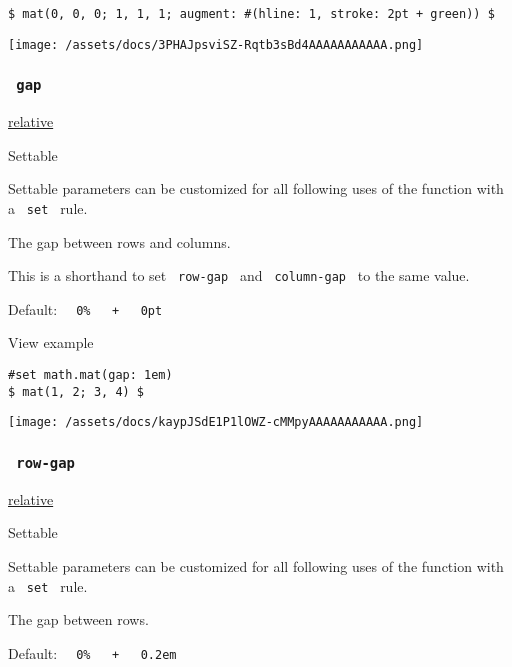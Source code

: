 \begin{verbatim}
$ mat(0, 0, 0; 1, 1, 1; augment: #(hline: 1, stroke: 2pt + green)) $
\end{verbatim}

\texttt{[image: /assets/docs/3PHAJpsviSZ-Rqtb3sBd4AAAAAAAAAAA.png]}

\subsubsection{\texorpdfstring{\texttt{\ gap\ }}{ gap }}\label{parameters-gap}

\href{/docs/reference/layout/relative/}{relative}

{{ Settable }}

\label{parameters-gap-settable-tooltip}
Settable parameters can be customized for all following uses of the
function with a \texttt{\ set\ } rule.

The gap between rows and columns.

This is a shorthand to set \texttt{\ row-gap\ } and
\texttt{\ column-gap\ } to the same value.

Default:
\texttt{\ }{\texttt{\ 0\%\ }}\texttt{\ }{\texttt{\ +\ }}\texttt{\ }{\texttt{\ 0pt\ }}\texttt{\ }


View example

\begin{verbatim}
#set math.mat(gap: 1em)
$ mat(1, 2; 3, 4) $
\end{verbatim}

\texttt{[image: /assets/docs/kaypJSdE1P1lOWZ-cMMpyAAAAAAAAAAA.png]}

\subsubsection{\texorpdfstring{\texttt{\ row-gap\ }}{ row-gap }}\label{parameters-row-gap}

\href{/docs/reference/layout/relative/}{relative}

{{ Settable }}

\label{parameters-row-gap-settable-tooltip}
Settable parameters can be customized for all following uses of the
function with a \texttt{\ set\ } rule.

The gap between rows.

Default:
\texttt{\ }{\texttt{\ 0\%\ }}\texttt{\ }{\texttt{\ +\ }}\texttt{\ }{\texttt{\ 0.2em\ }}\texttt{\ }

